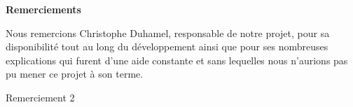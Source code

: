 \null
\vspace{4cm}
\begin{flushright}
	{\Large \bfseries Remerciements}

	\vspace{1cm}

	\begin{minipage}{0.62\textwidth}
		Nous remercions Christophe Duhamel, responsable de notre projet, pour sa disponibilité tout au long du développement ainsi que pour ses nombreuses explications qui furent d'une aide constante et sans lequelles nous n'aurions pas pu mener ce projet à son terme.
	\end{minipage}

	\vspace{1cm}

	\begin{minipage}{0.62\textwidth}
		Remerciement 2
	\end{minipage}

\end{flushright}
